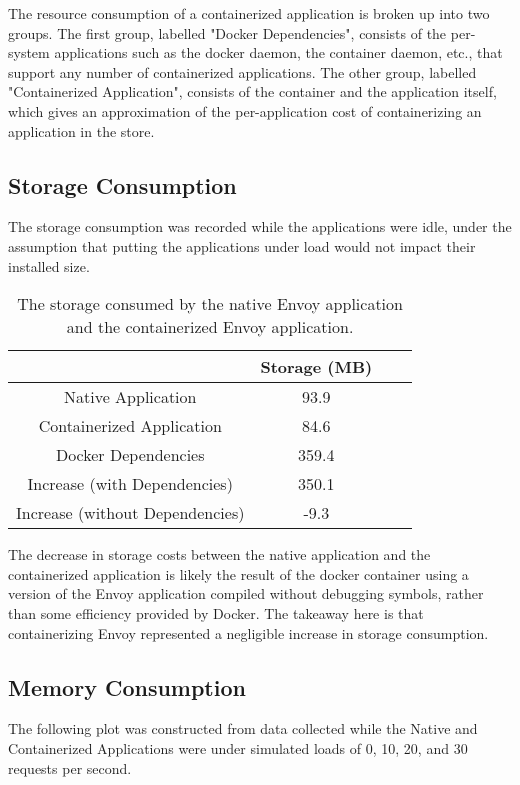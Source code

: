 \documentclass{article}
\begin{document}
The resource consumption of a containerized application is broken up into two groups. The first group, labelled "Docker Dependencies", consists of the per-system applications such as the docker daemon, the container daemon, etc., that support any number of containerized applications. The other group, labelled "Containerized Application", consists of the container and the application itself, which gives an approximation of the per-application cost of containerizing an application in the store.

\subsection{Storage Consumption}
The storage consumption was recorded while the applications were idle, under the assumption that putting the applications under load would not impact their installed size.

\begin{table}[H]
\begin{tabular}{ |c|c|c|c| }
 \hline
   & Storage (MB)\\ 
 \hline
 Native Application & 93.9 \\
 \hline
 Containerized Application & 84.6 \\
 \hline
 Docker Dependencies & 359.4\\
 \hline\hline
 Increase (with Dependencies) & 350.1 \\
 \hline
 Increase (without Dependencies) & -9.3 \\
 \hline
\end{tabular}
\caption{The storage consumed by the native Envoy application and the containerized Envoy application.}
\label{storage-consumption}
\end{table}

The decrease in storage costs between the native application and the containerized application is likely the result of the docker container using a version of the Envoy application compiled without debugging symbols, rather than some efficiency provided by Docker. The takeaway here is that containerizing Envoy represented a negligible increase in storage consumption.

\subsection{Memory Consumption}
The following plot was constructed from data collected while the Native and Containerized Applications were under simulated loads of 0, 10, 20, and 30 requests per second.
\end{document}
